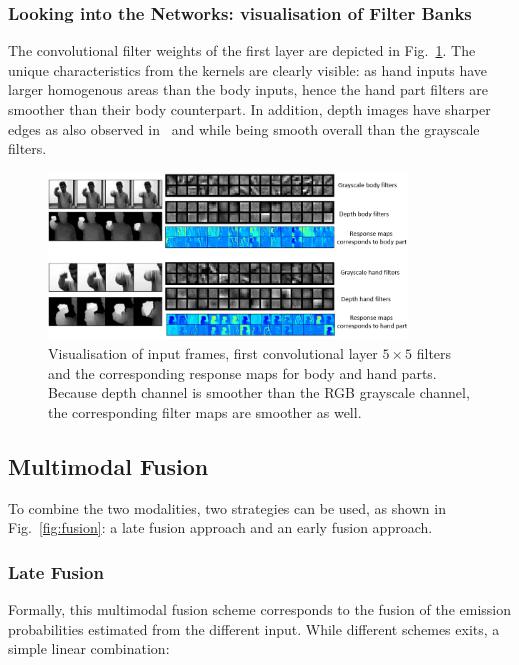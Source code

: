 \subsubsection{Looking into the Networks: visualisation of Filter Banks}

The convolutional filter weights of the first layer are depicted in Fig.~\ref{3dcnn_filters}. The unique characteristics from the kernels are clearly visible: as hand inputs have larger homogenous areas than the body inputs, hence the hand part filters are smoother than their body counterpart.
In addition, depth images have sharper edges as also observed in~\cite{socher2012convolutional} and while being smooth overall than the grayscale filters.

\begin{figure}[t]
  \centering
  \includegraphics[width=0.85\textwidth]{images/CNN_filters}
  \caption{Visualisation of input frames, first convolutional layer $5\times5$ filters and the corresponding response maps for body and hand parts. Because depth channel is smoother than the RGB grayscale channel, the corresponding filter maps are smoother as well. }\label{3dcnn_filters}
\end{figure}


\subsection{Multimodal Fusion}
To combine the two modalities, two strategies can be used, as shown in Fig.~\ref{fig:fusion}: a late fusion approach and an early fusion approach.


\subsubsection{Late Fusion}
Formally, this multimodal fusion scheme corresponds to the fusion of the emission probabilities estimated from the different input. While different schemes exits, a simple linear combination:

